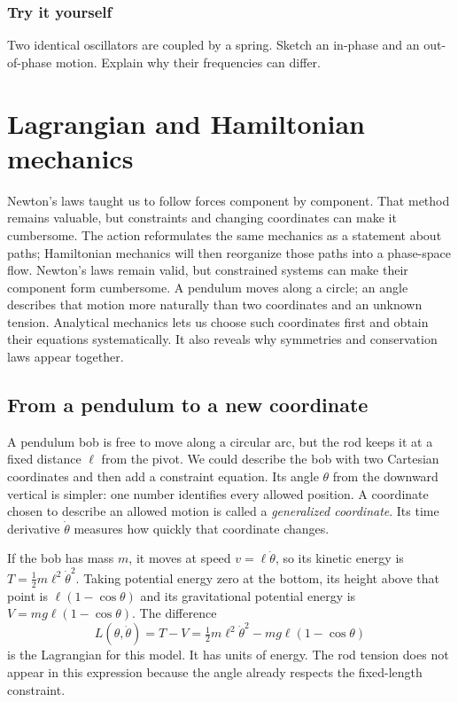 \documentclass[11pt,oneside]{book}
\theoremstyle{reviewstyle}
\newcommand{\learningcheck}[1]{\subsection*{Try it yourself}\noindent #1\par}
\begin{document}
\learningcheck{Two identical oscillators are coupled by a spring. Sketch an in-phase and an out-of-phase motion. Explain why their frequencies can differ.}

\chapter{Lagrangian and Hamiltonian mechanics}
Newton's laws taught us to follow forces component by component. That method remains valuable, but constraints and changing coordinates can make it cumbersome. The action reformulates the same mechanics as a statement about paths; Hamiltonian mechanics will then reorganize those paths into a phase-space flow.
Newton's laws remain valid, but constrained systems can make their component form cumbersome. A pendulum moves along a circle; an angle describes that motion more naturally than two coordinates and an unknown tension. Analytical mechanics lets us choose such coordinates first and obtain their equations systematically. It also reveals why symmetries and conservation laws appear together.

\section{From a pendulum to a new coordinate}
A pendulum bob is free to move along a circular arc, but the rod keeps it at a fixed distance $\ell$ from the pivot. We could describe the bob with two Cartesian coordinates and then add a constraint equation. Its angle $\theta$ from the downward vertical is simpler: one number identifies every allowed position. A coordinate chosen to describe an allowed motion is called a \emph{generalized coordinate}. Its time derivative $\dot\theta$ measures how quickly that coordinate changes.

If the bob has mass $m$, it moves at speed $v=\ell\dot\theta$, so its kinetic energy is $T=\tfrac12m\ell^2\dot\theta^2$. Taking potential energy zero at the bottom, its height above that point is $\ell(1-\cos\theta)$ and its gravitational potential energy is $V=mg\ell(1-\cos\theta)$. The difference
\begin{equation}
L(\theta,\dot\theta)=T-V
=\tfrac12m\ell^2\dot\theta^2-mg\ell(1-\cos\theta)
\end{equation}
is the Lagrangian for this model. It has units of energy. The rod tension does not appear in this expression because the angle already respects the fixed-length constraint.
\end{document}
